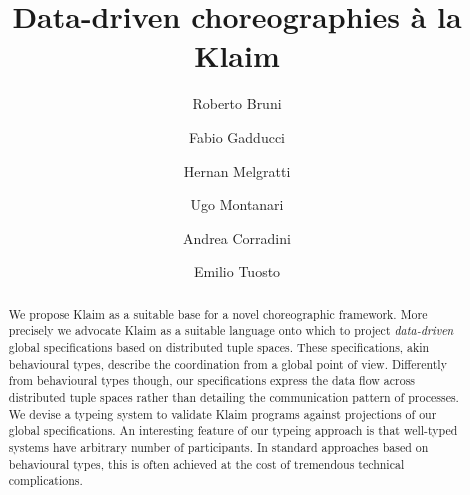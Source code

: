 \documentclass[runningheads,a4paper]{llncs}
\begin{document}
\mainmatter  %

\title{
  Data-driven choreographies \`a la Klaim
}


%
%

\author{
  Roberto Bruni  \and
  Fabio Gadducci  \and
  Hernan Melgratti  \and
  Ugo Montanari  \and
  Andrea Corradini  \and
  Emilio Tuosto
}
	

\maketitle

\begin{abstract}
  We propose Klaim as a suitable base for a novel choreographic
  framework.
  More precisely we advocate Klaim as a suitable language onto which
  to project \emph{data-driven} global specifications based on
  distributed tuple spaces.
  These specifications, akin behavioural types, describe the coordination
  from a global point of view.
  Differently from behavioural types though, our specifications
  express the data flow across distributed tuple spaces rather than
  detailing the communication pattern of processes.
  We devise a typeing system to validate Klaim programs against projections
  of our global specifications.
  An interesting feature of our typeing approach is that well-typed
  systems have arbitrary number of participants.
  In standard approaches based on behavioural types, this is often
  achieved at the cost of tremendous technical complications.
\end{abstract}
\end{document}
